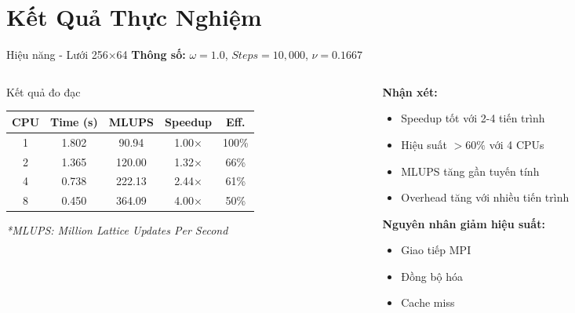 \documentclass[t, aspectratio=169]{beamer}
\begin{document}
	\useThickBar
	\useStyleLogoOnly
	
	\section{Kết Quả Thực Nghiệm}
	
	\begin{frame}{Hiệu năng - Lưới 256×64}
		\textbf{Thông số:} $\omega=1.0$, $Steps=10{,}000$, $\nu = 0.1667$
		
		\vspace{1em}
		
		\begin{columns}[T]
			\begin{column}{0.55\textwidth}
				\begin{block}{Kết quả đo đạc}
					\centering
					\begin{tabular}{|c|c|c|c|c|}
						\hline
						\textbf{CPU} & \textbf{Time (s)} & \textbf{MLUPS} & \textbf{Speedup} & \textbf{Eff.} \\
						\hline
						1 & 1.802 & 90.94 & 1.00× & 100\% \\
						\hline
						2 & 1.365 & 120.00 & 1.32× & 66\% \\
						\hline
						\alert{4} & \alert{0.738} & \alert{222.13} & \alert{2.44×} & \alert{61\%} \\
						\hline
						8 & 0.450 & 364.09 & 4.00× & 50\% \\
						\hline
					\end{tabular}
				\end{block}
				
				\vspace{0.5em}
				\footnotesize
				\textit{*MLUPS: Million Lattice Updates Per Second}
			\end{column}
			
			\begin{column}{0.45\textwidth}
				\textbf{Nhận xét:}
				\begin{itemize}
					\item Speedup tốt với 2-4 tiến trình
					\item Hiệu suất $>60\%$ với 4 CPUs
					\item MLUPS tăng gần tuyến tính
					\item Overhead tăng với nhiều tiến trình
				\end{itemize}
				
				\vspace{1em}
				
				\textbf{Nguyên nhân giảm hiệu suất:}
				\begin{itemize}
					\item Giao tiếp MPI
					\item Đồng bộ hóa
					\item Cache miss
				\end{itemize}
			\end{column}
		\end{columns}
	\end{frame}
	
\end{document}
